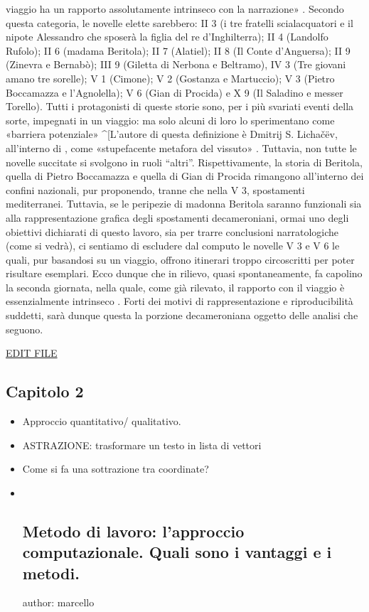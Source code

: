 viaggio ha un rapporto assolutamente intrinseco con la narrazione»
\autocite[p.~549]{asor1992}. Secondo questa categoria, le novelle elette
sarebbero: II 3 (i tre fratelli scialacquatori e il nipote Alessandro
che sposerà la figlia del re d'Inghilterra); II 4 (Landolfo Rufolo); II
6 (madama Beritola); II 7 (Alatiel); II 8 (Il Conte d'Anguersa); II 9
(Zinevra e Bernabò); III 9 (Giletta di Nerbona e Beltramo), IV 3 (Tre
giovani amano tre sorelle); V 1 (Cimone); V 2 (Gostanza e Martuccio); V
3 (Pietro Boccamazza e l'Agnolella); V 6 (Gian di Procida) e X 9 (Il
Saladino e messer Torello). Tutti i protagonisti di queste storie sono,
per i più svariati eventi della sorte, impegnati in un viaggio: ma solo
alcuni di loro lo sperimentano come «barriera potenziale»
\^{}{[}L'autore di questa definizione è Dmitrij S. Lichačëv, all'interno
di \autocite[pp.~26-39]{lotman1973}, come «stupefacente metafora del
vissuto» \autocite[p.~550]{asor1992}. Tuttavia, non tutte le novelle
succitate si svolgono in ruoli ``altri''. Rispettivamente, la storia di
Beritola, quella di Pietro Boccamazza e quella di Gian di Procida
rimangono all'interno dei confini nazionali, pur proponendo, tranne che
nella V 3, spostamenti mediterranei. Tuttavia, se le peripezie di
madonna Beritola saranno funzionali sia alla rappresentazione grafica
degli spostamenti decameroniani, ormai uno degli obiettivi dichiarati di
questo lavoro, sia per trarre conclusioni narratologiche (come si
vedrà), ci sentiamo di escludere dal computo le novelle V 3 e V 6 le
quali, pur basandosi su un viaggio, offrono itinerari troppo
circoscritti per poter risultare esemplari. Ecco dunque che in rilievo,
quasi spontaneamente, fa capolino la seconda giornata, nella quale, come
già rilevato, il rapporto con il viaggio è essenzialmente intrinseco
\autocite{zatti2004}. Forti dei motivi di rappresentazione e
riproducibilità suddetti, sarà dunque questa la porzione decameroniana
oggetto delle analisi che seguono.

\href{https://github.com/olablit2/geoBoccaccio/edit/master/docs/2018-article/30-chapter2.md}{EDIT
FILE}

\subsection{Capitolo 2}\label{capitolo-2}

\begin{itemize}
\item
  Approccio quantitativo/ qualitativo.
\item
  ASTRAZIONE: trasformare un testo in lista di vettori
\item
  Come si fa una sottrazione tra coordinate?
\item ~
  \subsection{Metodo di lavoro: l'approccio computazionale. Quali sono i
  vantaggi e i
  metodi.}\label{metodo-di-lavoro-lapproccio-computazionale.-quali-sono-i-vantaggi-e-i-metodi.}

  author: marcello
\end{itemize}

